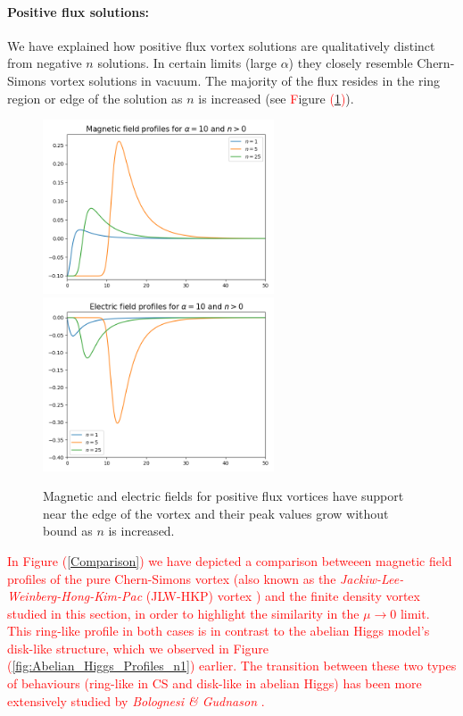 \paragraph{Positive flux solutions:}
We have explained how positive flux vortex solutions are qualitatively distinct from negative $n$ solutions. In certain limits (large $\alpha$) they closely resemble  Chern-Simons vortex solutions in vacuum.  
The majority of the flux resides in the ring region or edge of the solution as $n$ is increased (see \textcolor{red}{F}igure \textcolor{red}{(}\ref{positiveprofile}\textcolor{red}{)}).
\begin{figure}[H]
\begin{center}
 \includegraphics[width=2.7in]{Chapter_2_Folder_1912.11321/figures/B_alpha_10_positive_final.png} \includegraphics[width=2.7in]{Chapter_2_Folder_1912.11321/figures/E_alpha_10_positive_final.png}
     \caption[This figure depicts the magnetic and electric field profiles for positive flux.]{{Magnetic and electric fields for positive flux vortices have support near the edge of the vortex and their peak values grow without bound as $n$ is increased.}} \label{positiveprofile}
    \end{center}
\end{figure} 



 \textcolor{red}{In Figure (\ref{Comparison}) we have depicted a comparison betweeen magnetic field profiles of the pure Chern-Simons vortex (also known as the \textit{Jackiw-Lee-Weinberg-Hong-Kim-Pac} (JLW-HKP) vortex \cite{Hong1990, Jackiw:1990aw, Jackiw:1990pr}) and the finite density vortex studied in this section, in order to highlight the similarity in the $\mu \rightarrow 0$ limit. This ring-like profile in both cases is in contrast to the abelian Higgs model's disk-like structure, which we observed in Figure (\ref{fig:Abelian_Higgs_Profiles_n1}) earlier. The transition between these two types of behaviours (ring-like in CS and disk-like in abelian Higgs) has been more extensively studied by \textit{Bolognesi \& Gudnason} \cite{Bolognesi:2007ez}. }


